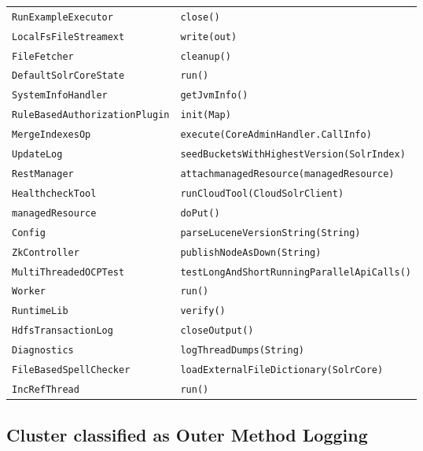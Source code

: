 \begin{center}
\begin{longtable}{ll}
\lstinline/RunExampleExecutor/&{\lstinline/close()/}\\
\lstinline/LocalFsFileStreamext/&{\lstinline/write(out)/}\\
\lstinline/FileFetcher/&{\lstinline/cleanup()/}\\
\lstinline/DefaultSolrCoreState/&{\lstinline/run()/}\\
\lstinline/SystemInfoHandler/&{\lstinline/getJvmInfo()/}\\
\lstinline/RuleBasedAuthorizationPlugin/&{\lstinline/init(Map)/}\\
\lstinline/MergeIndexesOp/&{\lstinline/execute(CoreAdminHandler.CallInfo)/}\\
\lstinline/UpdateLog/&{\lstinline/seedBucketsWithHighestVersion(SolrIndex)/}\\
\lstinline/RestManager/&{\lstinline/attachmanagedResource(managedResource)/}\\
\lstinline/HealthcheckTool/&{\lstinline/runCloudTool(CloudSolrClient)/}\\
\lstinline/managedResource/&{\lstinline/doPut()/}\\
\lstinline/Config/&{\lstinline/parseLuceneVersionString(String)/}\\
\lstinline/ZkController/&{\lstinline/publishNodeAsDown(String)/}\\
\lstinline/MultiThreadedOCPTest/&{\lstinline/testLongAndShortRunningParallelApiCalls()/}\\
\lstinline/Worker/&{\lstinline/run()/}\\
\lstinline/RuntimeLib/&{\lstinline/verify()/}\\
\lstinline/HdfsTransactionLog/&{\lstinline/closeOutput()/}\\
\lstinline/Diagnostics/&{\lstinline/logThreadDumps(String)/}\\
\lstinline/FileBasedSpellChecker/&{\lstinline/loadExternalFileDictionary(SolrCore)/}\\
\lstinline/IncRefThread/&{\lstinline/run()/}\\

\end{longtable}
\end{center}


\subsection{Cluster classified as Outer Method Logging}

